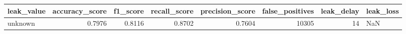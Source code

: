 \begin{tabular}{lrrrrrrl}
\toprule
leak\_value & accuracy\_score & f1\_score & recall\_score & precision\_score & false\_positives & leak\_delay & leak\_loss \\
\midrule
unknown & 0.7976 & 0.8116 & 0.8702 & 0.7604 & 10305 & 14 & NaN \\
\bottomrule
\end{tabular}
